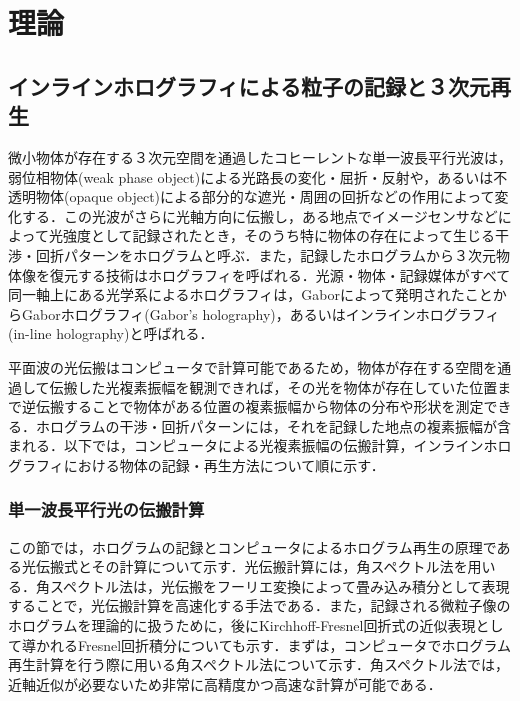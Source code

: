 \section{理論}
\subsection{インラインホログラフィによる粒子の記録と３次元再生}\label{sec:in-lineHolography}
微小物体が存在する３次元空間を通過したコヒーレントな単一波長平行光波は，弱位相物体(weak phase object)による光路長の変化・屈折・反射や，あるいは不透明物体(opaque object)による部分的な遮光・周囲の回折などの作用によって変化する．この光波がさらに光軸方向に伝搬し，ある地点でイメージセンサなどによって光強度として記録されたとき，そのうち特に物体の存在によって生じる干渉・回折パターンをホログラムと呼ぶ．また，記録したホログラムから３次元物体像を復元する技術はホログラフィ\cite{gabor}を呼ばれる．光源・物体・記録媒体がすべて同一軸上にある光学系によるホログラフィは，Gaborによって発明されたことからGaborホログラフィ(Gabor's holography)，あるいはインラインホログラフィ(in-line holography)と呼ばれる．

平面波の光伝搬はコンピュータで計算可能である\cite{kreis}ため，物体が存在する空間を通過して伝搬した光複素振幅を観測できれば，その光を物体が存在していた位置まで逆伝搬することで物体がある位置の複素振幅から物体の分布や形状を測定できる．ホログラムの干渉・回折パターンには，それを記録した地点の複素振幅が含まれる．以下では，コンピュータによる光複素振幅の伝搬計算，インラインホログラフィにおける物体の記録・再生方法について順に示す．

\subsubsection{単一波長平行光の伝搬計算}\label{sec:lightwaveProp}
この節では，ホログラムの記録とコンピュータによるホログラム再生の原理である光伝搬式とその計算について示す．光伝搬計算には，角スペクトル法\cite{goodman}を用いる．角スペクトル法は，光伝搬をフーリエ変換によって畳み込み積分として表現することで，光伝搬計算を高速化する手法である．また，記録される微粒子像のホログラムを理論的に扱うために，後にKirchhoff-Fresnel回折式の近似表現として導かれるFresnel回折積分\cite{kreis}についても示す．まずは，コンピュータでホログラム再生計算を行う際に用いる角スペクトル法について示す．角スペクトル法では，近軸近似が必要ないため非常に高精度かつ高速な計算が可能である．


